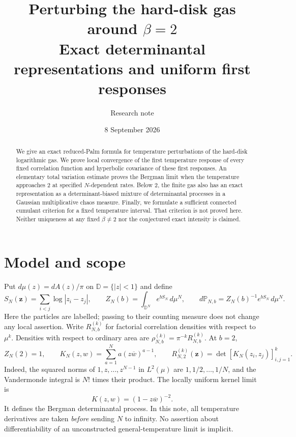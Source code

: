 \documentclass[11pt]{article}
\title{Perturbing the hard-disk gas around $\beta=2$\\[3pt]\large Exact determinantal representations and uniform first responses}
\author{Research note}
\date{8 September 2026}
\theoremstyle{remark}\newtheorem{remark}[theorem]{Remark}
\newcommand{\D}{\mathbb D}
\newcommand{\Pp}{\mathbb P}
\begin{document}
\maketitle
\begin{abstract}
We give an exact reduced-Palm formula for temperature perturbations of the
hard-disk logarithmic gas. We prove local convergence of the first temperature
response of every fixed correlation function and hyperbolic covariance of
these first responses. An elementary total variation estimate proves the
Bergman limit when the temperature approaches $2$ at specified
$N$-dependent rates. Below $2$, the finite gas also has an exact representation
as a determinant-biased mixture of determinantal processes in a Gaussian
multiplicative chaos measure. Finally, we formulate a sufficient connected
cumulant criterion for a fixed temperature interval. That criterion is not
proved here. Neither uniqueness at any fixed $\beta\ne2$ nor the conjectured
exact intensity is claimed.
\end{abstract}

\section{Model and scope}
Put $d\mu(z)=dA(z)/\pi$ on $\D=\{|z|<1\}$ and define
\[
 S_N(\mathbf z)=\sum_{i<j}\log|z_i-z_j|,\qquad
 Z_N(b)=\int_{\D^N}e^{bS_N}\,d\mu^N,\qquad
 d\Pp_{N,b}=Z_N(b)^{-1}e^{bS_N}\,d\mu^N.
\]
Here the particles are labelled; passing to their counting measure does not
change any local assertion. Write $R_{N,b}^{(k)}$ for factorial correlation
densities with respect to $\mu^k$. Densities with respect to ordinary area are
$\rho_{N,b}^{(k)}=\pi^{-k}R_{N,b}^{(k)}$.
At $b=2$,
\[
 Z_N(2)=1,\qquad
 K_N(z,w)=\sum_{a=1}^N a(z\overline w)^{a-1},\qquad
 R_{N,2}^{(k)}(\mathbf z)=\det[K_N(z_i,z_j)]_{i,j=1}^k.
\]
Indeed, the squared norms of $1,z,\ldots,z^{N-1}$ in $L^2(\mu)$ are
$1,1/2,\ldots,1/N$, and the Vandermonde integral is $N!$ times their product.
The locally uniform kernel limit is
\[
 K(z,w)=(1-z\overline w)^{-2}.
\]
It defines the Bergman determinantal process. In this note, all temperature
derivatives are taken \emph{before} sending $N$ to infinity. No assertion
about differentiability of an unconstructed general-temperature limit is
implicit.
\end{document}
